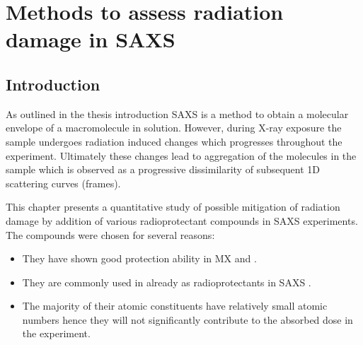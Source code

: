 \chapter{Methods to assess radiation damage in SAXS}
\label{chap:Methods to assess radiation damage in SAXS}

\section{Introduction}
\label{sec:Introduction}
 As outlined in the thesis introduction SAXS is a method to obtain a molecular envelope of a macromolecule in solution.
 However, during X-ray exposure the sample undergoes radiation induced changes which progresses throughout the experiment.
 Ultimately these changes lead to aggregation of the molecules in the sample which is observed as a progressive dissimilarity of subsequent 1D scattering curves (frames).

 This chapter presents a quantitative study of possible mitigation of radiation damage by addition of various radioprotectant compounds in SAXS experiments. The compounds were chosen for several reasons:
 \begin{itemize}
     \item They have shown good protection ability in MX \cite{allan2012} and \cite{southworth2007radioprotectant}.
     \item They are commonly used in already as radioprotectants in SAXS \cite{grishaev2012sample}.
     \item The majority of their atomic constituents have relatively small atomic numbers hence they will not significantly contribute to the absorbed dose in the experiment.
 \end{itemize}
